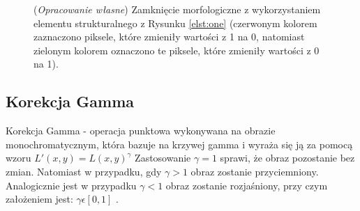 \documentclass{article}
\begin{document}
        \begin{figure}[H]
            \centering
            \qquad
            \qquad
            \caption
            {
                (\textit{Opracowanie własne}) Zamknięcie morfologiczne z wykorzystaniem elementu strukturalnego z Rysunku \ref{elst:one} (czerwonym kolorem zaznaczono piksele, które zmieniły wartości z 1 na 0, natomiast zielonym kolorem oznaczono te piksele, które zmieniły wartości z 0 na 1).
            }
            \label{zamknieciemorfologiczne}
        \end{figure}

        \subsection{Korekcja Gamma}
        {
            \label{sec:korekcja-gamma}
            \Large
            \justifying
            \quad
            Korekcja Gamma - operacja punktowa wykonywana na obrazie monochromatycznym, która bazuje na krzywej gamma i wyraża się ją za pomocą wzoru \(L'(x,y) = L(x,y)^\gamma\)
            Zastosowanie \(\gamma = 1\) sprawi, że obraz pozostanie bez zmian.
            Natomiast w przypadku, gdy \(\gamma > 1\) obraz zostanie przyciemniony.
            Analogicznie jest w przypadku \(\gamma < 1\) obraz zostanie rozjaśniony, przy czym założeniem jest: \(\gamma \epsilon \left[0,1\right]\) \cite{Digital Image Processing Second Edition}.
        }
    \newpage
\end{document}
